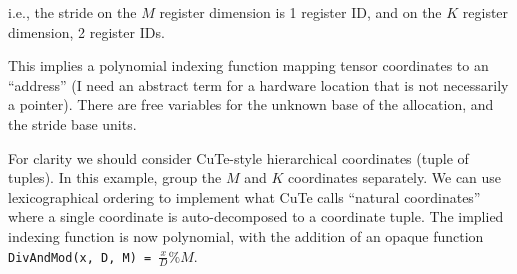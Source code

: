 

i.e., the stride on the $M$ register dimension is 1 register ID, and on the $K$ register dimension, 2 register IDs.

This implies a polynomial indexing function mapping tensor coordinates to an ``address'' (I need an abstract term for a hardware location that is not necessarily a pointer).
There are free variables for the unknown base of the allocation, and the stride base units.



For clarity we should consider CuTe-style hierarchical coordinates (tuple of tuples).
In this example, group the $M$ and $K$ coordinates separately.
We can use lexicographical ordering to implement what CuTe calls ``natural coordinates'' where a single coordinate is auto-decomposed to a coordinate tuple.
The implied indexing function is now polynomial, with the addition of an opaque function \texttt{DivAndMod(x, D, M) = $\frac{x}{D} \% M$}.



